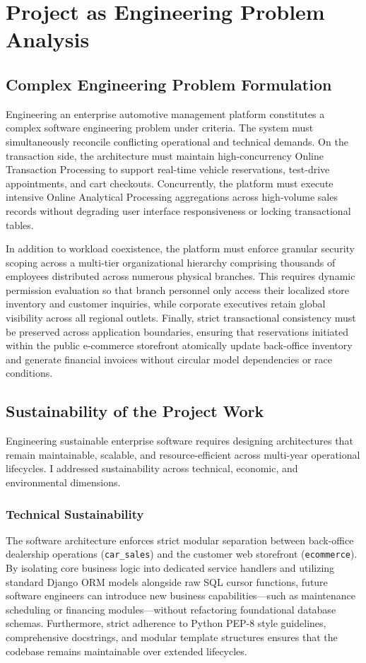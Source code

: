 \chapter{Project as Engineering Problem Analysis}

\section{Complex Engineering Problem Formulation}
Engineering an enterprise automotive management platform constitutes a complex software engineering problem under criteria. The system must simultaneously reconcile conflicting operational and technical demands. On the transaction side, the architecture must maintain high-concurrency Online Transaction Processing to support real-time vehicle reservations, test-drive appointments, and cart checkouts. Concurrently, the platform must execute intensive Online Analytical Processing aggregations across high-volume sales records without degrading user interface responsiveness or locking transactional tables.

In addition to workload coexistence, the platform must enforce granular security scoping across a multi-tier organizational hierarchy comprising thousands of employees distributed across numerous physical branches. This requires dynamic permission evaluation so that branch personnel only access their localized store inventory and customer inquiries, while corporate executives retain global visibility across all regional outlets. Finally, strict transactional consistency must be preserved across application boundaries, ensuring that reservations initiated within the public e-commerce storefront atomically update back-office inventory and generate financial invoices without circular model dependencies or race conditions.

\section{Sustainability of the Project Work}
Engineering sustainable enterprise software requires designing architectures that remain maintainable, scalable, and resource-efficient across multi-year operational lifecycles. I addressed sustainability across technical, economic, and environmental dimensions.

\subsection{Technical Sustainability}
The software architecture enforces strict modular separation between back-office dealership operations (\texttt{car\_sales}) and the customer web storefront (\texttt{ecommerce}). By isolating core business logic into dedicated service handlers and utilizing standard Django ORM models alongside raw SQL cursor functions, future software engineers can introduce new business capabilities—such as maintenance scheduling or financing modules—without refactoring foundational database schemas. Furthermore, strict adherence to Python PEP-8 style guidelines, comprehensive docstrings, and modular template structures ensures that the codebase remains maintainable over extended lifecycles.

